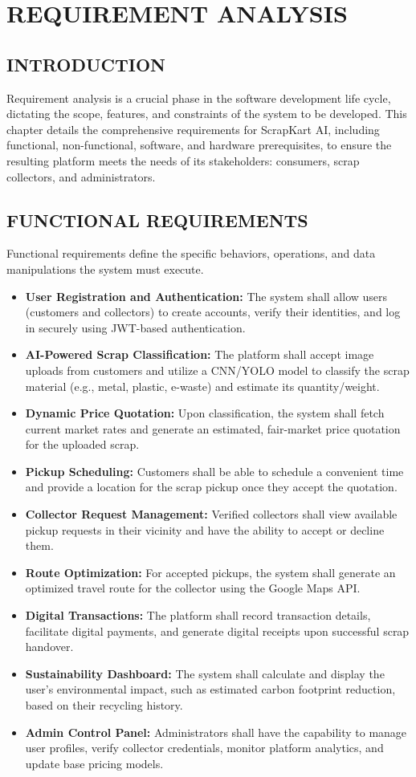 \chapter{REQUIREMENT ANALYSIS}

\section{INTRODUCTION}
Requirement analysis is a crucial phase in the software development life cycle, dictating the scope, features, and constraints of the system to be developed. This chapter details the comprehensive requirements for ScrapKart AI, including functional, non-functional, software, and hardware prerequisites, to ensure the resulting platform meets the needs of its stakeholders: consumers, scrap collectors, and administrators.

\section{FUNCTIONAL REQUIREMENTS}
Functional requirements define the specific behaviors, operations, and data manipulations the system must execute.
\begin{itemize}
    \item \textbf{User Registration and Authentication:} The system shall allow users (customers and collectors) to create accounts, verify their identities, and log in securely using JWT-based authentication.
    \item \textbf{AI-Powered Scrap Classification:} The platform shall accept image uploads from customers and utilize a CNN/YOLO model to classify the scrap material (e.g., metal, plastic, e-waste) and estimate its quantity/weight.
    \item \textbf{Dynamic Price Quotation:} Upon classification, the system shall fetch current market rates and generate an estimated, fair-market price quotation for the uploaded scrap.
    \item \textbf{Pickup Scheduling:} Customers shall be able to schedule a convenient time and provide a location for the scrap pickup once they accept the quotation.
    \item \textbf{Collector Request Management:} Verified collectors shall view available pickup requests in their vicinity and have the ability to accept or decline them.
    \item \textbf{Route Optimization:} For accepted pickups, the system shall generate an optimized travel route for the collector using the Google Maps API.
    \item \textbf{Digital Transactions:} The platform shall record transaction details, facilitate digital payments, and generate digital receipts upon successful scrap handover.
    \item \textbf{Sustainability Dashboard:} The system shall calculate and display the user's environmental impact, such as estimated carbon footprint reduction, based on their recycling history.
    \item \textbf{Admin Control Panel:} Administrators shall have the capability to manage user profiles, verify collector credentials, monitor platform analytics, and update base pricing models.
\end{itemize}

